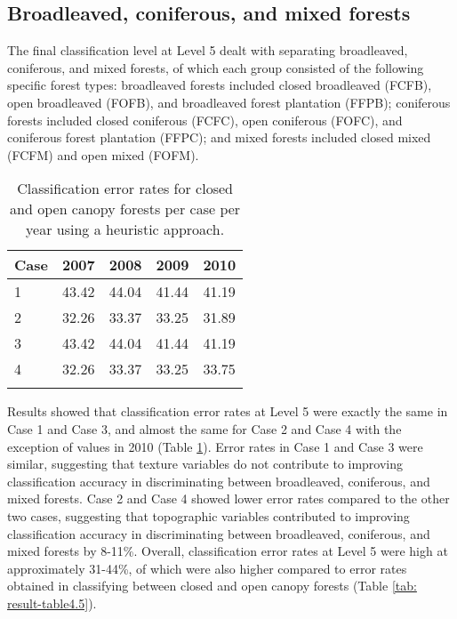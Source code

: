 \subsection{Broadleaved, coniferous, and mixed forests}

The final classification level at Level 5 dealt with separating broadleaved, coniferous, and mixed forests, of which each group consisted of the following specific forest types: broadleaved forests included closed broadleaved (FCFB), open broadleaved (FOFB), and broadleaved forest plantation (FFPB); coniferous forests included closed coniferous (FCFC), open coniferous (FOFC), and coniferous forest plantation (FFPC); and mixed forests included closed mixed (FCFM) and open mixed (FOFM).\\

\begin{spacing}{1.0}
\begin{longtable}[h!]{ p{2.6cm} p{2.6cm} p{2.6cm} p{2.6cm} p{2.6cm} }

    \caption[Classification error rates for closed and open canopy forests per case per year using a heuristic approach.]{Classification error rates for closed and open canopy forests per case per year using a heuristic approach.}
    \label{tab: result-table4.6}\\
    
    	\toprule
    	Case & 2007 & 2008 & 2009 & 2010\\
    	\midrule
    	\endhead
    	
		1 & 43.42 & 44.04 & 41.44 & 41.19\\
		2 & 32.26 & 33.37 & 33.25 & 31.89\\
		3 & 43.42 & 44.04 & 41.44 & 41.19\\
		4 & 32.26 & 33.37 & 33.25 & 33.75\\
		
		\bottomrule \\
    
\end{longtable}
\end{spacing}

Results showed that classification error rates at Level 5 were exactly the same in Case 1 and Case 3, and almost the same for Case 2 and Case 4 with the exception of values in 2010 (Table \ref{tab: result-table4.6}). Error rates in Case 1 and Case 3 were similar, suggesting that texture variables do not contribute to improving classification accuracy in discriminating between broadleaved, coniferous, and mixed forests. Case 2 and Case 4 showed lower error rates compared to the other two cases, suggesting that topographic variables contributed to improving classification accuracy in discriminating between broadleaved, coniferous, and mixed forests by 8-11\%. Overall, classification error rates at Level 5 were high at approximately 31-44\%, of which were also higher compared to error rates obtained in classifying between closed and open canopy forests (Table \ref{tab: result-table4.5}).

